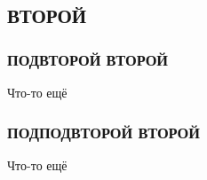 \subsection{ВТОРОЙ}\label{sec:Second}

\subsubsection{ПОДВТОРОЙ ВТОРОЙ}

Что-то ещё

\subsubsection{ПОДПОДВТОРОЙ ВТОРОЙ}

Что-то ещё

\newpage
